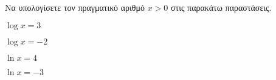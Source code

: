 Να υπολογίσετε τον πραγματικό αριθμό $ x>0 $ στις παρακάτω παραστάσεις.
\begin{multicols}{2}
\begin{rlist}
\item $ \log{x}=3 $
\item $ \log{x}=-2 $
\item $ \ln{x}=4 $
\item $ \ln{x}=-3 $
\end{rlist}
\end{multicols}

